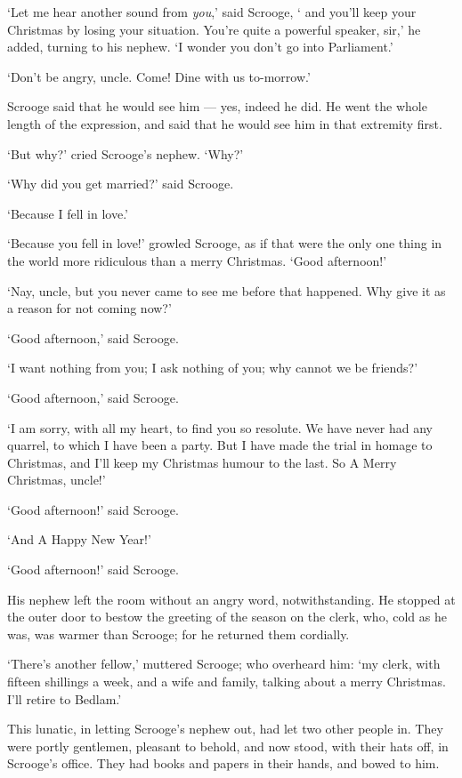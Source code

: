 \documentclass[11pt,twoside]{article}\makeatletter
\begin{document}
‘Let me hear another sound from \textit{you},’ said Scrooge,  ‘ and you'll keep your Christmas by losing your situation. You're quite a powerful speaker, sir,’ he added, turning to his nephew.  ‘I wonder you don't go into Parliament.’\par
‘Don't be angry, uncle.  Come!  Dine with us to-morrow.’\par
Scrooge said that he would see him — yes, indeed he did. He went the whole length of the expression, and said that he would see him in that extremity first.  \par
‘But why?’ cried Scrooge's nephew.  ‘Why?’\par
‘Why did you get married?’ said Scrooge.  \par
‘Because I fell in love.’\par
‘Because you fell in love!’ growled Scrooge, as if that were the only one thing in the world more ridiculous than a merry Christmas.  ‘Good afternoon!’\par
‘Nay, uncle, but you never came to see me before that happened.  Why give it as a reason for not coming now?’\par
‘Good afternoon,’ said Scrooge.  \par
‘I want nothing from you; I ask nothing of you; why cannot we be friends?’\par
‘Good afternoon,’ said Scrooge.  \par
‘I am sorry, with all my heart, to find you so resolute. We have never had any quarrel, to which I have been a party.  But I have made the trial in homage to Christmas, and I'll keep my Christmas humour to the last.  So A Merry Christmas, uncle!’\par
‘Good afternoon!’ said Scrooge.  \par
‘And A Happy New Year!’\par
‘Good afternoon!’ said Scrooge.  \par
His nephew left the room without an angry word, notwithstanding. He stopped at the outer door to bestow the greeting of the season on the clerk, who, cold as he was, was warmer than Scrooge; for he returned them cordially.  \par
‘There's another fellow,’ muttered Scrooge; who overheard him: ‘my clerk, with fifteen shillings a week, and a wife and family, talking about a merry Christmas.  I'll retire to Bedlam.’\par
This lunatic, in letting Scrooge's nephew out, had let two other people in.  They were portly gentlemen, pleasant to behold, and now stood, with their hats off, in Scrooge's office. They had books and papers in their hands, and bowed to him.  \par
\end{document}
